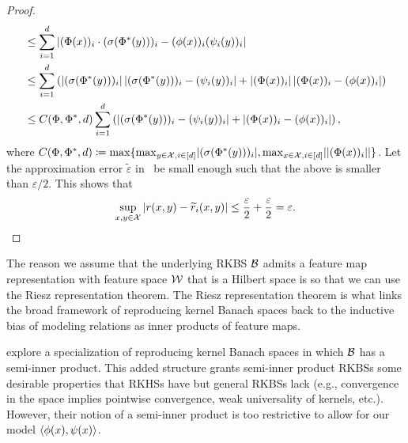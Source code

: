 \begin{proof}
\begin{align*}
        &\leq \sum_{i=1}^{d} \abs{(\Phi(x))_i \cdot (\sigma(\Phi^*(y)))_i - (\phi(x))_i(\psi_i(y))_i} \\
        &\leq \sum_{i=1}^{d} \paren{\abs{(\sigma(\Phi^*(y)))_i} \abs{(\sigma(\Phi^*(y)))_i - (\psi_i(y))_i} + \abs{(\Phi(x))_i} \abs{(\Phi(x))_i - (\phi(x))_i}}\\
        &\leq C(\Phi, \Phi^*, d) \sum_{i=1}^{d} \paren{\abs{(\sigma(\Phi^*(y)))_i - (\psi_i(y))_i} + \abs{(\Phi(x))_i - (\phi(x))_i}},
    \end{align*}
    where $C(\Phi, \Phi^*, d) \coloneq \max\{\max_{y \in {\mathcal{X}}, i \in [d]} \lvert(\sigma(\Phi^*(y)))_i\rvert, \max_{x \in {\mathcal{X}}, i \in [d]} \lvert\left\lvert(\Phi(x))_i\right\rvert\rvert\}$. Let the approximation error $\tilde{\varepsilon}$ in~ be small enough such that the above is smaller than $\varepsilon / 2$. This shows that
    \begin{equation*}
        \sup_{x,y \in \calX} \abs{r(x,y) - \tilde{r}_i(x,y)} \leq \frac{\varepsilon}{2} + \frac{\varepsilon}{2} = \varepsilon.
    \end{equation*}
\end{proof}

\begin{remark}
    The reason we assume that the underlying RKBS ${\mathcal{B}}$ admits a feature map representation with feature space ${\mathcal{W}}$ that is a Hilbert space is so that we can use the Riesz representation theorem. The Riesz representation theorem is what links the broad framework of reproducing kernel Banach spaces back to the inductive bias of modeling relations as inner products of feature maps.
\end{remark}

\begin{remark}
    \citet{zhangReproducingKernel2009} explore a specialization of reproducing kernel Banach spaces in which ${\mathcal{B}}$ has a semi-inner product. This added structure grants semi-inner product RKBSs some desirable properties that RKHSs have but general RKBSs lack (e.g., convergence in the space implies pointwise convergence, weak universality of kernels, etc.). However, their notion of a semi-inner product is too restrictive to allow for our model $\left \langle \phi(x), \psi(x) \right\rangle$.
\end{remark}
